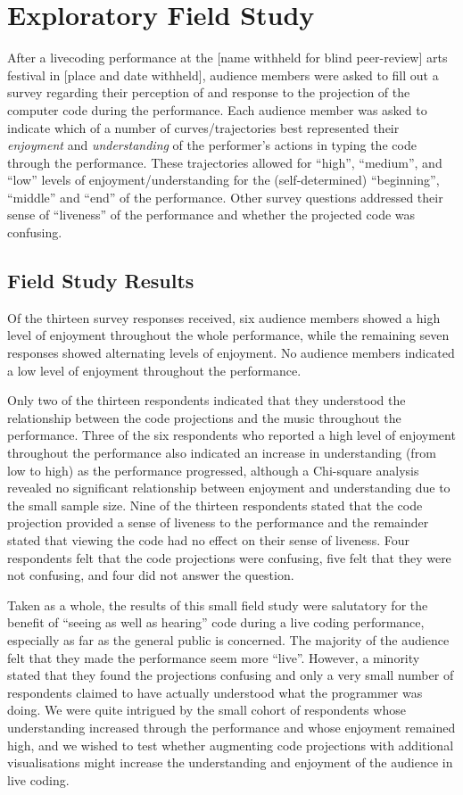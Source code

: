 \documentclass{sig-alternate}
\begin{document}
\section{Exploratory Field Study}

After a livecoding performance at the [name withheld for blind
peer-review] arts festival in [place and date withheld], audience
members were asked to fill out a survey regarding their perception of
and response to the projection of the computer code during the
performance. Each audience member was asked to indicate which of a
number of curves/trajectories best represented their \emph{enjoyment}
and \emph{understanding} of the performer's actions in typing the code
through the performance. These trajectories allowed for ``high'',
``medium'', and ``low'' levels of enjoyment/understanding for the
(self-determined) ``beginning'', ``middle'' and ``end'' of the
performance. Other survey questions addressed their sense of
``liveness'' of the performance \cite{Auslander} and whether the
projected code was confusing.

\subsection{Field Study Results}

Of the thirteen survey responses received, six audience members showed
a high level of enjoyment throughout the whole performance, while the
remaining seven responses showed alternating levels of enjoyment. No
audience members indicated a low level of enjoyment throughout the
performance.

Only two of the thirteen respondents indicated that they understood
the relationship between the code projections and the music throughout
the performance. Three of the six respondents who reported a high
level of enjoyment throughout the performance also indicated an
increase in understanding (from low to high) as the performance
progressed, although a Chi-square analysis revealed no significant
relationship between enjoyment and understanding due to the small
sample size. Nine of the thirteen respondents stated that the code
projection provided a sense of liveness to the performance and the
remainder stated that viewing the code had no effect on their sense of
liveness. Four respondents felt that the code projections were
confusing, five felt that they were not confusing, and four did not
answer the question.

Taken as a whole, the results of this small field study were
salutatory for the benefit of ``seeing as well as hearing'' code
during a live coding performance, especially as far as the general
public is concerned. The majority of the audience felt that they made
the performance seem more ``live''. However, a minority stated that
they found the projections confusing and only a very small number of
respondents claimed to have actually understood what the programmer
was doing. We were quite intrigued by the small cohort of respondents
whose understanding increased through the performance and whose
enjoyment remained high, and we wished to test whether augmenting code
projections with additional visualisations might increase the
understanding and enjoyment of the audience in live coding.
\end{document}
